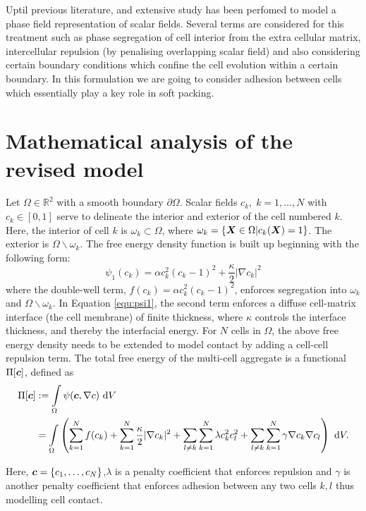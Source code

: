 \documentclass[idxtotoc,hyperref,openany]{labbook} %
\def\bX{\mbox{\boldmath$ X$}}
\def\bc{\mbox{\boldmath$ c$}}
\begin{document}
Uptil previous literature, and extensive study has been perfomed to model a phase field representation of scalar fields. Several terms are considered for this treatment such as phase segregation of cell interior from the extra cellular matrix, intercellular repulsion (by penalising overlapping scalar field) and also considering certain boundary conditions which confine the cell evolution within a certain boundary. In this formulation we are going to consider adhesion between cells which essentially play a key role in soft packing. 

\section{Mathematical analysis of the revised model}
Let $\Omega\in \mathbb{R}^2$ with a smooth boundary $\partial \Omega$. Scalar fields $c_k, \;k = 1,\dots,N$ with $c_k \in [0,1]$ serve to delineate the interior and exterior of the cell numbered $k$. Here, the interior of cell $k$ is $\omega_k \subset \Omega$, where $\omega_k = \{ \bX \in \Omega\vert c_k(\bX) =1\}$. The exterior is $\Omega\backslash\omega_k$. The free energy density function is built up beginning with the following form:
\begin{equation}
\psi_1(c_k) = \alpha c_k^2(c_k-1)^2 + \frac{\kappa}{2}\vert\nabla c_k\vert^2 
\label{equ:psi1}
\end{equation}
where the double-well term, $f(c_k) = \alpha c_k^2(c_k-1)^2$, enforces segregation into $\omega_k$ and $\Omega\backslash\omega_k$. In Equation \eqref{equ:psi1}, the second term enforces a diffuse cell-matrix interface (the cell membrane) of finite thickness, where $\kappa$ controls the interface thickness, and thereby the interfacial energy. For $N$ cells in $\Omega$, the above free energy density needs to be extended to model contact by adding a cell-cell repulsion term. The total free energy of the multi-cell aggregate is a functional $\Pi[\bc]$, defined as
\begin{align}
\Pi[\bc] &:= \int\limits_\Omega \psi(\bc,\nabla c) ~\text{d}V\nonumber\\
&=\int\limits_\Omega \left(\sum_{k=1}^{N} f(c_k) + \sum_{k=1}^{N} \frac{\kappa}{2}\vert\nabla c_k\vert^2 + \sum_{l\ne k}\sum_{k=1}^{N}\lambda c_k^2 c_l^2 + \sum_{l\ne k}\sum_{k=1}^{N}\gamma\nabla c_k \nabla c_l \right) ~\text{d}V.
\label{equ:energy}
\end{align}

Here, $\bc = \{c_1,\dots,c_N\}$,$\lambda$ is a penalty coefficient that enforces repulsion and $\gamma$ is another penalty coefficient that enforces adhesion between any two cells $k,l$ thus modelling cell contact.
\end{document}
